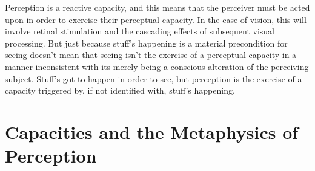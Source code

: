 \documentclass[12pt]{article}
\begin{document}
Perception is a reactive capacity, and this means that the perceiver must be acted upon in order to exercise their perceptual capacity. In the case of vision, this will involve retinal stimulation and the cascading effects of subsequent visual processing. But just because stuff's happening is a material precondition for seeing doesn't mean that seeing isn't the exercise of a perceptual capacity in a manner inconsistent with its merely being a conscious alteration of the perceiving subject. Stuff's got to happen in order to see, but perception is the exercise of a capacity triggered by, if not identified with, stuff's happening.


\section{Capacities and the Metaphysics of Perception} %
\label{sec:capacities_and_the_metaphysics_of_perception}
\end{document}
